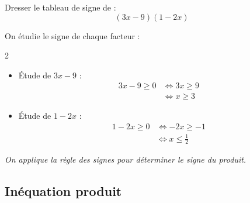 \begin{methode}
	Dresser le tableau de signe de :
	\[
		(3x - 9)(1 - 2x)
	\]

	\begin{correction}
		On étudie le signe de chaque facteur :
		\begin{multicols}{2}
			\begin{itemize}
				\item {Étude de $3x - 9$ :}
				      \[
					      \begin{aligned}
						      3x - 9 \ge 0 & \iff 3x \ge 9 \\
						                   & \iff x \ge 3
					      \end{aligned}
				      \]
				\item {Étude de $1 - 2x$ :}
				      \[
					      \begin{aligned}
						      1 - 2x \ge 0 & \iff -2x \ge -1         \\
						                   & \iff x \le \tfrac{1}{2}
					      \end{aligned}
				      \]
			\end{itemize}
		\end{multicols}

		\begin{center}
		\end{center}
		\textit{On applique la règle des signes pour déterminer le signe du produit.}
	\end{correction}
\end{methode}

\subsection{Inéquation produit}

